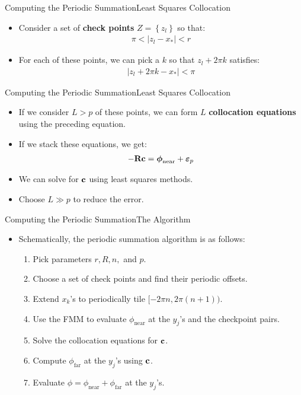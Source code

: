 \documentclass{beamer}
\newcommand{\set}[1]{\left\{#1\right\}}
\newcommand{\phinear}{\phi_{\operatorname{near}}}
\newcommand{\phifar}{\phi_{\operatorname{far}}}
\begin{document}
\begin{frame}{Computing the Periodic Summation}{Least Squares Collocation}
  \begin{itemize}
  \item Consider a set of \textbf{check points} $Z = \set{z_l}$ so that:
    \begin{align*}
      \pi < |z_l - x_*| < r
    \end{align*}
  \item For each of these points, we can pick a $k$
    so that $z_l + 2\pi k$ satisfies:
    \begin{align*}
      |z_l + 2\pi k - x_*| < \pi
    \end{align*}
  \end{itemize}
\end{frame}

\begin{frame}{Computing the Periodic Summation}{Least Squares Collocation}
  \begin{itemize}
  \item If we consider $L > p$
    of these points, we can form $L$
    \textbf{collocation equations} using the preceding equation.
    \pause
  \item If we stack these equations, we get:
    \begin{align*}
      -\bold{R} \bold{c} = \boldsymbol{\phi}_{\operatorname{near}} + \boldsymbol{\varepsilon}_p
    \end{align*}
    \pause
  \item We can solve for $\bold{c}$ using least squares methods.
  \item Choose $L \gg p$ to reduce the error.
  \end{itemize}
\end{frame}

\begin{frame}{Computing the Periodic Summation}{The Algorithm}
  \begin{itemize}
  \item Schematically, the periodic summation algorithm is as follows:
    \begin{enumerate}
    \item Pick parameters $r, R, n,$ and $p$.
    \item Choose a set of check points and find their periodic offsets.
    \item Extend $x_k$'s to periodically tile $[-2\pi n, 2\pi(n+1))$.
    \item Use the FMM to evaluate $\phinear$
      at the $y_j$'s and the checkpoint pairs.
    \item Solve the collocation equations for $\bold{c}$.
    \item Compute $\phifar$ at the $y_j$'s using $\bold{c}$.
    \item Evaluate $\phi = \phinear + \phifar$ at the $y_j$'s.
    \end{enumerate}
  \end{itemize}
\end{frame}
\end{document}
